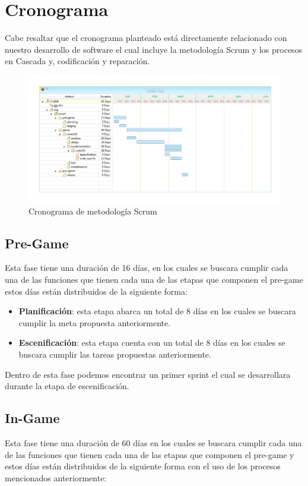 \section{Cronograma}
Cabe resaltar que el cronograma planteado está directamente relacionado con nuestro desarrollo de software el cual incluye la metodología Scrum y los procesos en Cascada y, codificación y reparación.

\begin{figure}[H]
	\centering
	\includegraphics[scale=0.10,]{imagenes/Metodologia/cronograma.pdf}
	\caption{Cronograma de metodología Scrum }
	\label{fig:cronograma}
\end{figure}

\subsection{Pre-Game}
Esta fase tiene una duración de 16 días, en los cuales se buscara cumplir cada una de las funciones que tienen cada una de las etapas que componen el pre-game estos días están distribuidos de la siguiente forma:
\begin{itemize}
	\item \textbf{Planificación}: esta etapa abarca un total de 8 días en los cuales se buscara cumplir la meta propuesta anteriormente.
	\item \textbf{Escenificación}: esta etapa cuenta con  un total de 8 días en los cuales se buscara cumplir las tareas propuestas anteriormente.
	
\end{itemize}

Dentro de esta fase podemos encontrar un primer sprint el cual se desarrollara durante la etapa de escenificación.

\subsection{In-Game}
Esta fase tiene una duración de 60 días en los cuales se buscara cumplir cada una de las funciones que tienen cada una de las etapas que componen el pre-game y estos días están distribuidos de la siguiente forma con el uso de los procesos mencionados anteriormente:

